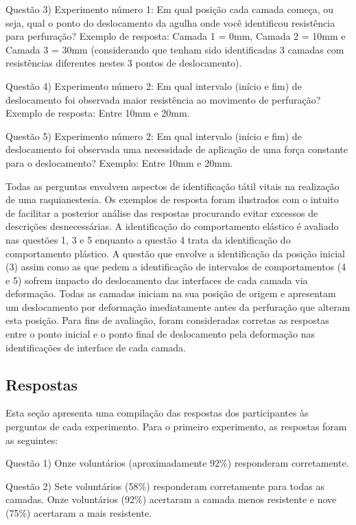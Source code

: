 Questão 3) Experimento número 1: Em qual posição cada camada começa, ou seja, qual o ponto do deslocamento da agulha onde você identificou resistência para perfuração? 
Exemplo de resposta: Camada 1 = 0mm, Camada 2 = 10mm e Camada 3 = 30mm (considerando que tenham sido identificadas 3 camadas com resistências diferentes nestes 3 pontos de deslocamento).

Questão 4) Experimento número 2: Em qual intervalo (início e fim) de deslocamento foi observada maior resistência ao movimento de perfuração? 
Exemplo de resposta: Entre 10mm e 20mm.

Questão 5) Experimento número 2: Em qual intervalo (início e fim) de deslocamento foi observada uma necessidade de aplicação de uma força constante para o deslocamento? 
Exemplo: Entre 10mm e 20mm.

Todas as perguntas envolvem aspectos de identificação tátil vitais na realização de uma raquianestesia. Os exemplos de resposta foram ilustrados com o intuito de facilitar a posterior análise das respostas procurando evitar excessos de descrições desnecessárias. A identificação do comportamento elástico é avaliado nas questões 1, 3 e 5 enquanto a questão 4 trata da identificação do comportamento plástico. A questão que envolve a identificação da posição inicial (3) assim como as que pedem a identificação de intervalos de comportamentos (4 e 5) sofrem impacto do deslocamento das interfaces de cada camada via deformação. Todas as camadas iniciam na sua posição de origem e apresentam um deslocamento por deformação imediatamente antes da perfuração que alteram esta posição. Para fins de avaliação, foram consideradas corretas as respostas entre o ponto inicial e o ponto final de deslocamento pela deformação nas identificações de interface de cada camada.  

\subsection{Respostas}
\label{sec:respostas}

Esta seção apresenta uma compilação das respostas dos participantes às perguntas de cada experimento. Para o primeiro
experimento, as respostas foram as seguintes:

Questão 1) Onze voluntários (aproximadamente 92\%) responderam corretamente.

Questão 2) Sete voluntários (58\%) responderam corretamente para todas as camadas. Onze voluntários (92\%) acertaram a camada menos resistente e nove (75\%) acertaram a mais resistente.

